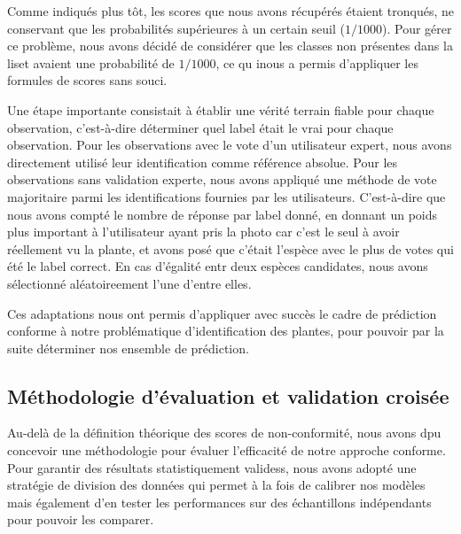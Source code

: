 \documentclass[a4paper,12pt]{article}
\begin{document}
\vspace{0.2cm}

Comme indiqués plus tôt, les scores que nous avons récupérés étaient tronqués, ne conservant que les probabilités supérieures à un certain seuil ($1/1000$). Pour gérer ce problème, nous avons décidé de considérer que les classes non présentes dans la liset avaient une probabilité de $1/1000$, ce qu inous a permis d'appliquer les formules de scores sans souci.

\vspace{0.2cm}

Une étape importante consistait à établir une vérité terrain fiable pour chaque observation, c'est-à-dire déterminer quel label était le vrai pour chaque observation. Pour les observations avec le vote d'un utilisateur expert, nous avons directement utilisé leur identification comme référence absolue. Pour les observations sans validation experte, nous avons appliqué une méthode de vote majoritaire parmi les identifications fournies par les utilisateurs. C'est-à-dire que nous avons compté le nombre de réponse par label donné, en donnant un poids plus important à l'utilisateur ayant pris la photo car c'est le seul à avoir réellement vu la plante, et avons posé que c'était l'espèce avec le plus de votes qui été le label correct. En cas d'égalité entr deux espèces candidates, nous avons sélectionné aléatoireement l'une d'entre elles.

\vspace{0.2cm}

Ces adaptations nous ont permis d'appliquer avec succès le cadre de prédiction conforme à notre problématique d'identification des plantes, pour pouvoir par la suite déterminer nos ensemble de prédiction.


\subsection{Méthodologie d'évaluation et validation croisée}

Au-delà de la définition théorique des scores de non-conformité, nous avons dpu concevoir une méthodologie pour évaluer l'efficacité de notre approche conforme. Pour garantir des résultats statistiquement validess, nous avons adopté une stratégie de division des données qui permet à la fois de calibrer nos modèles mais également d'en tester les performances sur des échantillons indépendants pour pouvoir les comparer.
\end{document}
